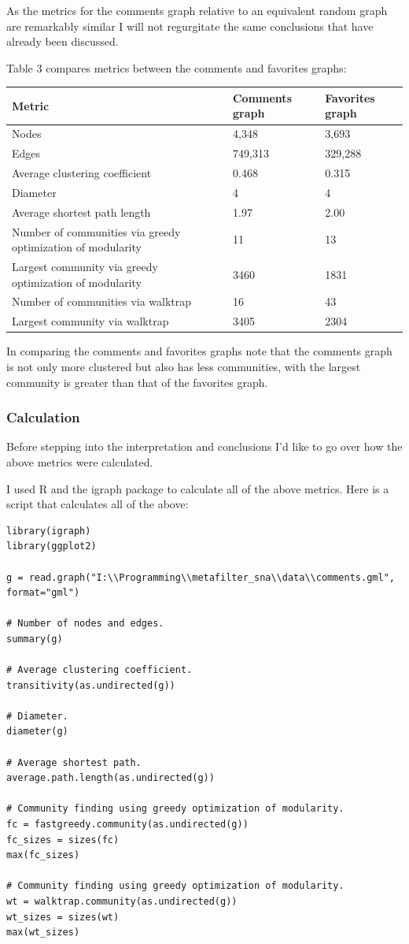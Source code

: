 As the metrics for the comments graph relative to an equivalent random
graph are remarkably similar I will not regurgitate the same conclusions
that have already been discussed.

Table 3 compares metrics between the comments and favorites graphs:

\begin{tabular}{|l|l|l|}\hline
Metric & Comments graph & Favorites graph \\ \hline
Nodes  & 4,348 & 3,693 \\
Edges  & 749,313 & 329,288 \\
Average clustering coefficient & 0.468 & 0.315 \\
Diameter & 4 & 4 \\
Average shortest path length & 1.97 & 2.00 \\
Number of communities via greedy optimization of modularity & 11 & 13 \\
Largest community via greedy optimization of modularity & 3460 & 1831 \\
Number of communities via walktrap & 16 & 43 \\
Largest community via walktrap & 3405 & 2304 \\
\end{tabular}

In comparing the comments and favorites graphs note that the comments
graph is not only more clustered but also has less communities, with the
largest community is greater than that of the favorites graph.

\subsubsection{Calculation}

Before stepping into the interpretation and conclusions I'd like to go
over how the above metrics were calculated.

I used R and the igraph package to calculate all of the above metrics.
Here is a script that calculates all of the above:

\begin{verbatim}
library(igraph)
library(ggplot2)

g = read.graph("I:\\Programming\\metafilter_sna\\data\\comments.gml", format="gml")

# Number of nodes and edges.
summary(g)

# Average clustering coefficient.
transitivity(as.undirected(g))

# Diameter.
diameter(g)

# Average shortest path.
average.path.length(as.undirected(g))

# Community finding using greedy optimization of modularity.
fc = fastgreedy.community(as.undirected(g))    
fc_sizes = sizes(fc)
max(fc_sizes)

# Community finding using greedy optimization of modularity.
wt = walktrap.community(as.undirected(g))
wt_sizes = sizes(wt)
max(wt_sizes)
\end{verbatim}

